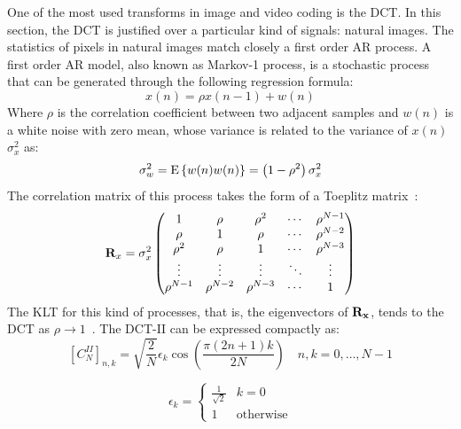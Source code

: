 \documentclass[11pt,a4paper,openright,twoside]{book}
\numberwithin{equation}{section} %
\numberwithin{figure}{section} %
\numberwithin{table}{section} %
\begin{document}
One of the most used transforms in image and video coding is the
\ac{DCT}.
In this section, the \ac{DCT} is justified over a particular kind
of signals: natural images.
The statistics of pixels in natural images match closely a first order
\ac{AR} process.
A first order \ac{AR} model, also known as Markov-1 process, is a stochastic
process that can be generated through the following regression formula:
\begin{equation}
	x(n) = \rho x(n-1) + w(n)
	\label{eqn:first_order_ar_model}
\end{equation}
Where $\rho$ is the correlation coefficient between two adjacent samples
and $w(n)$ is a white noise with zero mean, whose variance is related to
the variance of $x(n)$ $\sigma_x^2$ as:
\begin{equation}
	\sigma_w^2 = \text{E}\left\{ w(n) w(n) \right\} =
	\left(1-\rho^2\right)\sigma_x^2
\end{equation}
The correlation matrix of this process takes the form of a Toeplitz
matrix~\cite{akansu-12-toeplitz-approximation}:
\begin{equation}
	\mathbf{R}_x = \sigma_x^2
	\begin{pmatrix}
		1          & \rho       & \rho^2     & \cdots & \rho^{N-1} \\
		\rho       & 1          & \rho       & \cdots & \rho^{N-2} \\
		\rho^2     & \rho       & 1          & \cdots & \rho^{N-3} \\
		\vdots     & \vdots     & \vdots     & \ddots & \vdots     \\
		\rho^{N-1} & \rho^{N-2} & \rho^{N-3} & \cdots & 1
	\end{pmatrix}
	\label{eqn:toeplitz_matrix}
\end{equation}
The \ac{KLT} for this kind of processes, that is, the eigenvectors of
$\mathbf{R}_{\mathbf{x}}$, tends to the \ac{DCT} as $\rho\to1$~\cite{britanak-06-dct-and-dst}.
The \ac{DCT}-II can be expressed compactly as:
\begin{equation}
	{\left[C_{N}^{II} \right]}_{n,k} =
	\sqrt{\frac{2}{N}}\epsilon_k\cos\left(\frac{\pi(2n+1)k}{2N}\right)
	\quad
	n,k=0,\dots,N-1
	\label{eqn:dct_ii}
\end{equation}

\begin{equation}
	\epsilon_k =
	\begin{cases}
		\frac{1}{\sqrt{2}} & k = 0 \\
		1 & \text{otherwise}
	\end{cases}
\end{equation}
\end{document}

